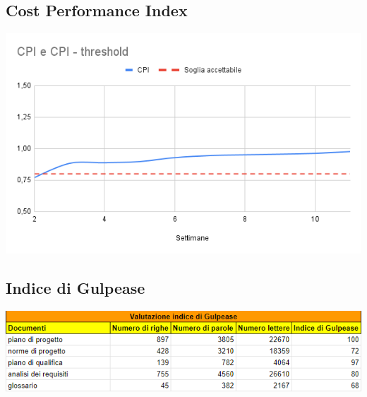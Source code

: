 \documentclass[12pt]{article}
\begin{document}
\subsection{Cost Performance Index}
\begin{center}
	\includegraphics[scale=0.6]{CPI.png}
\end{center}
\subsection{Indice di Gulpease}
\begin{center}
	\includegraphics[scale=0.8]{Gulpease.png}
\end{center}
\end{document}

